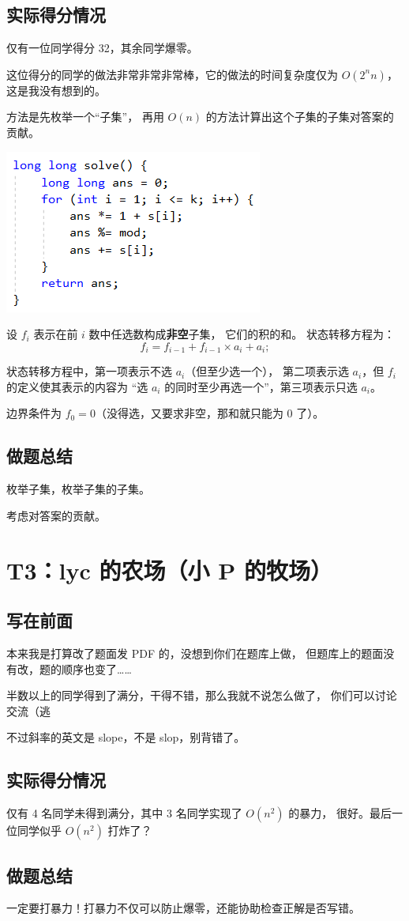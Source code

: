 \documentclass[UTF8]{article}
\begin{document}
	\subsection{实际得分情况}

	仅有一位同学得分 32，其余同学爆零。
	
	这位得分的同学的做法非常非常非常棒，它的做法的时间复杂度仅为 $O(2^n n)$，
	这是我没有想到的。

	方法是先枚举一个``子集''，
	再用 $O(n)$ 的方法计算出这个子集的子集对答案的贡献。

	\includegraphics[scale=0.65]{pic/pic3.png}

	设 $f_{i}$ 表示在前 $i$ 数中任选数构成\textbf{非空}子集，
	它们的积的和。
	状态转移方程为：
	$$
	f_{i} = f_{i - 1} + f_{i - 1} \times a_i + a_i;
	$$

	状态转移方程中，第一项表示不选 $a_i$（但至少选一个），
	第二项表示选 $a_i$，但 $f_i$ 的定义使其表示的内容为
	``选 $a_i$ 的同时至少再选一个''，第三项表示只选 $a_i$。

	边界条件为 $f_{0} = 0$（没得选，又要求非空，那和就只能为 $0$ 了）。

	\subsection{做题总结}

	枚举子集，枚举子集的子集。
	
	考虑对答案的贡献。

	\section{T3：lyc 的农场（小 P 的牧场）}

	\subsection{写在前面}

	本来我是打算改了题面发 PDF 的，没想到你们在题库上做，
	但题库上的题面没有改，题的顺序也变了……

	半数以上的同学得到了满分，干得不错，那么我就不说怎么做了，
	你们可以讨论交流（逃

	不过斜率的英文是 slope，不是 slop，别背错了。

	\subsection{实际得分情况}

	仅有 4 名同学未得到满分，其中 3 名同学实现了 $O(n^2)$ 的暴力，
	很好。最后一位同学似乎 $O(n^2)$ 打炸了？

	\subsection{做题总结}

	一定要打暴力！打暴力不仅可以防止爆零，还能协助检查正解是否写错。
\end{document}
